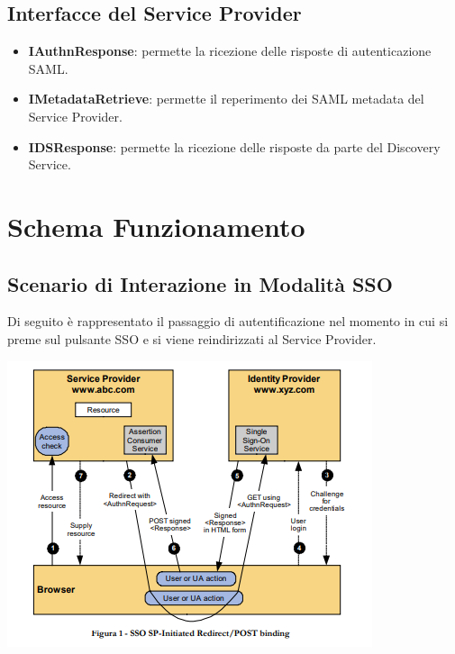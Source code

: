 \subsection{Interfacce del Service Provider}
\begin{itemize}
    \item \textbf{IAuthnResponse}: permette la ricezione delle risposte di autenticazione SAML.
    \item \textbf{IMetadataRetrieve}: permette il reperimento dei SAML metadata del Service Provider.
    \item \textbf{IDSResponse}: permette la ricezione delle risposte da parte del Discovery Service.
\end{itemize}

\pagebreak
\section{Schema Funzionamento}
\subsection{Scenario di Interazione in Modalità SSO}
Di seguito è rappresentato il passaggio di autentificazione nel momento in cui si preme sul pulsante SSO e si viene reindirizzati al Service Provider.
\begin{center}
	\includegraphics[scale = 1]{./res/images/ScenarioUsoSPIDSchema.PNG}
\end{center}

